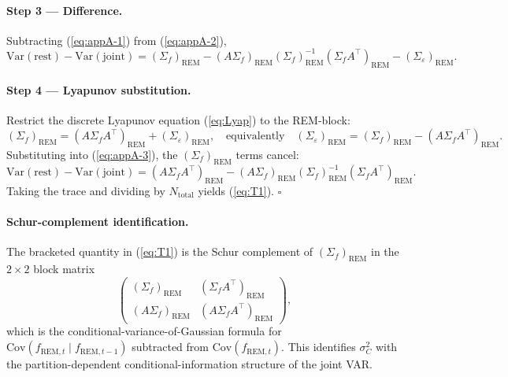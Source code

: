\documentclass[11pt,letterpaper]{article}
\theoremstyle{remark}
\newcommand{\REM}{\mathrm{REM}}
\newcommand{\Sigmaf}{\Sigma_f}
\newcommand{\Sigmae}{\Sigma_\varepsilon}
\newcommand{\Ntot}{N_{\mathrm{total}}}
\newcommand{\sigC}{\sigma^2_C}
\newcommand{\Var}{\mathrm{Var}}
\newcommand{\Cov}{\mathrm{Cov}}
\begin{document}
\paragraph{Step 3 --- Difference.} Subtracting (\ref{eq:appA-1}) from (\ref{eq:appA-2}),
\begin{equation}\label{eq:appA-3}
\Var(\mathrm{rest}) - \Var(\mathrm{joint}) = (\Sigmaf)_\REM - (A \Sigmaf)_\REM (\Sigmaf)_\REM^{-1} (\Sigmaf A^\top)_\REM - (\Sigmae)_\REM.
\end{equation}

\paragraph{Step 4 --- Lyapunov substitution.} Restrict the discrete Lyapunov equation (\ref{eq:Lyap}) to the REM-block:
\begin{equation*}
(\Sigmaf)_\REM = (A \Sigmaf A^\top)_\REM + (\Sigmae)_\REM,
\quad \text{equivalently} \quad
(\Sigmae)_\REM = (\Sigmaf)_\REM - (A \Sigmaf A^\top)_\REM.
\end{equation*}
Substituting into (\ref{eq:appA-3}), the $(\Sigmaf)_\REM$ terms cancel:
\begin{equation*}
\Var(\mathrm{rest}) - \Var(\mathrm{joint}) = (A \Sigmaf A^\top)_\REM - (A \Sigmaf)_\REM (\Sigmaf)_\REM^{-1} (\Sigmaf A^\top)_\REM.
\end{equation*}
Taking the trace and dividing by $\Ntot$ yields (\ref{eq:T1}). $\square$

\paragraph{Schur-complement identification.} The bracketed quantity in (\ref{eq:T1}) is the Schur complement of $(\Sigmaf)_\REM$ in the $2 \times 2$ block matrix
\begin{equation*}
\begin{pmatrix} (\Sigmaf)_\REM & (\Sigmaf A^\top)_\REM \\ (A \Sigmaf)_\REM & (A \Sigmaf A^\top)_\REM \end{pmatrix},
\end{equation*}
which is the conditional-variance-of-Gaussian formula for $\Cov(f_{\REM, t} \mid f_{\REM, t-1})$ subtracted from $\Cov(f_{\REM, t})$. This identifies $\sigC$ with the partition-dependent conditional-information structure of the joint VAR.
\end{document}
